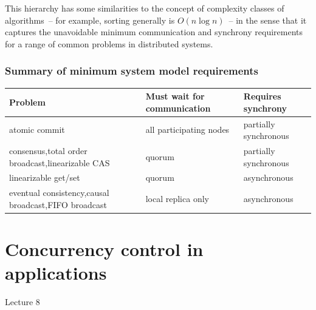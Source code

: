 This hierarchy has some similarities to the concept of complexity classes of algorithms~-- for example, sorting generally is $O(n \log n)$~-- in the sense that it captures the unavoidable minimum communication and synchrony requirements for a range of common problems in distributed systems.

\begin{frame}
    \label{s:model-requirements}
    \frametitle{Summary of minimum system model requirements}
    \renewcommand{\arraystretch}{1.5}%
    \begin{tabular}{>{\raggedright}p{3.7cm}|>{\raggedright}p{3cm}|>{\raggedright\arraybackslash}p{2.4cm}} %
        \textbf{Problem} & \textbf{Must wait for communication} & \textbf{Requires synchrony} \\\hline
        atomic commit & all participating nodes & partially synchronous\pause\\
        consensus,\newline total order broadcast,\newline linearizable CAS & quorum & partially synchronous\pause\\
        linearizable get/set & quorum & asynchronous\pause\\
        eventual consistency,\newline causal broadcast,\newline FIFO broadcast & local replica only & asynchronous \\\hline
    \end{tabular}
\end{frame}
\label{l:model-requirements}


\section{Concurrency control in applications}\label{sec:concurrency-control}

\begin{frame}
    \begin{center}
        Lecture 8\\[2em]
        \Large{\color{darkblue}{Concurrency control in applications}}
    \end{center}
\end{frame}

